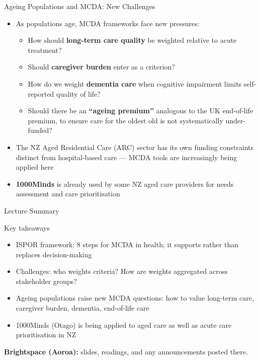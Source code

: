 \documentclass[aspectratio=169, 12pt]{beamer}
\newcommand{\summaryside}[1]{%
  \begin{frame}{Lecture Summary}
    \begin{exampleblock}{Key takeaways}
      \begin{itemize}#1\end{itemize}
    \end{exampleblock}
    \vspace{0.5em}
    {\footnotesize\textcolor{OtagoGold}{\textbf{Brightspace (Aoroa):}} slides, readings, and any announcements posted there.}
  \end{frame}}
\begin{document}
\begin{frame}{Ageing Populations and MCDA: New Challenges}
  \begin{itemize}
    \item As populations age, MCDA frameworks face new pressures:
    \begin{itemize}
      \item How should \textbf{long-term care quality} be weighted relative to acute treatment?
      \item Should \textbf{caregiver burden} enter as a criterion?
      \item How do we weight \textbf{dementia care} when cognitive impairment limits
            self-reported quality of life?
      \item Should there be an \textbf{``ageing premium''} analogous to the UK end-of-life
            premium, to ensure care for the oldest old is not systematically under-funded?
    \end{itemize}
    \item The NZ Aged Residential Care (ARC) sector has its own funding constraints distinct
          from hospital-based care --- MCDA tools are increasingly being applied here
    \item \textbf{1000Minds} is already used by some NZ aged care providers for needs
          assessment and care prioritisation
  \end{itemize}
\end{frame}

\summaryside{
  \item ISPOR framework: 8 steps for MCDA in health; it supports rather than replaces decision-making
  \item Challenges: who weights criteria? How are weights aggregated across stakeholder groups?
  \item Ageing populations raise new MCDA questions: how to value long-term care, caregiver burden, dementia, end-of-life care
  \item 1000Minds (Otago) is being applied to aged care as well as acute care prioritisation in NZ
}


\end{document}
